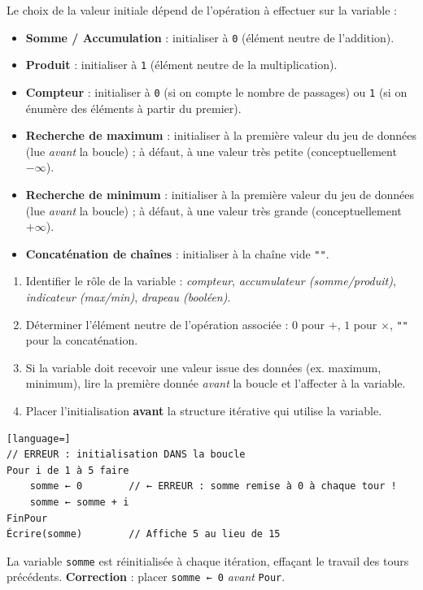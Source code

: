 \documentclass[11pt]{article}
\begin{document}
\begin{propriete}
Le choix de la valeur initiale dépend de l'opération à effectuer sur la variable :
\begin{itemize}
    \item \textbf{Somme / Accumulation} : initialiser à \texttt{0} (élément neutre de l'addition).
    \item \textbf{Produit} : initialiser à \texttt{1} (élément neutre de la multiplication).
    \item \textbf{Compteur} : initialiser à \texttt{0} (si on compte le nombre de passages) ou \texttt{1} (si on énumère des éléments à partir du premier).
    \item \textbf{Recherche de maximum} : initialiser à la première valeur du jeu de données (lue \emph{avant} la boucle) ; à défaut, à une valeur très petite (conceptuellement $-\infty$).
    \item \textbf{Recherche de minimum} : initialiser à la première valeur du jeu de données (lue \emph{avant} la boucle) ; à défaut, à une valeur très grande (conceptuellement $+\infty$).
    \item \textbf{Concaténation de chaînes} : initialiser à la chaîne vide \texttt{""}.
\end{itemize}
\end{propriete}

\begin{methode}
\begin{enumerate}
    \item Identifier le rôle de la variable : \emph{compteur}, \emph{accumulateur (somme/produit)}, \emph{indicateur (max/min)}, \emph{drapeau (booléen)}.
    \item Déterminer l'élément neutre de l'opération associée : $0$ pour $+$, $1$ pour $\times$, \texttt{""} pour la concaténation.
    \item Si la variable doit recevoir une valeur issue des données (ex. maximum, minimum), lire la première donnée \emph{avant} la boucle et l'affecter à la variable.
    \item Placer l'initialisation \textbf{avant} la structure itérative qui utilise la variable.
\end{enumerate}
\end{methode}

\begin{attention}
\begin{lstlisting}[language=]
// ERREUR : initialisation DANS la boucle
Pour i de 1 à 5 faire
    somme ← 0        // ← ERREUR : somme remise à 0 à chaque tour !
    somme ← somme + i
FinPour
Écrire(somme)        // Affiche 5 au lieu de 15
\end{lstlisting}
\noindent La variable \texttt{somme} est réinitialisée à chaque itération, effaçant le travail des tours précédents. \textbf{Correction} : placer \texttt{somme ← 0} \emph{avant} \texttt{Pour}.
\end{attention}
\end{document}

